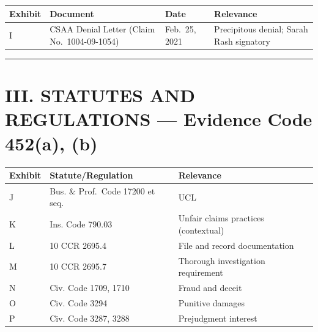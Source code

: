 {\def\LTcaptype{table} %
\begin{longtable}[]{@{}
  >{\raggedright\arraybackslash}p{}
  >{\raggedright\arraybackslash}p{}
  >{\raggedright\arraybackslash}p{}
  >{\raggedright\arraybackslash}p{}@{}}
\toprule\noalign{}
\begin{minipage}[b]{\linewidth}\raggedright
Exhibit
\end{minipage} & \begin{minipage}[b]{\linewidth}\raggedright
Document
\end{minipage} & \begin{minipage}[b]{\linewidth}\raggedright
Date
\end{minipage} & \begin{minipage}[b]{\linewidth}\raggedright
Relevance
\end{minipage} \\
\midrule\noalign{}
\endhead
\bottomrule\noalign{}
\endlastfoot
I & CSAA Denial Letter (Claim No.~1004-09-1054) & Feb.~25, 2021 & Precipitous denial; Sarah Rash signatory \\
\end{longtable}
}

\begin{center}\rule{0.5\linewidth}{0.5pt}\end{center}

\section{III. STATUTES AND REGULATIONS --- Evidence Code \textsection{}\textsection{} 452(a), (b)}\label{iii.-statutes-and-regulations-evidence-code-452a-b}

{\def\LTcaptype{table} %
\begin{longtable}[]{@{}lll@{}}
\toprule\noalign{}
Exhibit & Statute/Regulation & Relevance \\
\midrule\noalign{}
\endhead
\bottomrule\noalign{}
\endlastfoot
J & Bus. \& Prof.~Code \textsection{} 17200 et seq. & UCL \\
K & Ins. Code \textsection{} 790.03 & Unfair claims practices (contextual) \\
L & 10 CCR \textsection{} 2695.4 & File and record documentation \\
M & 10 CCR \textsection{} 2695.7 & Thorough investigation requirement \\
N & Civ. Code \textsection{}\textsection{} 1709, 1710 & Fraud and deceit \\
O & Civ. Code \textsection{} 3294 & Punitive damages \\
P & Civ. Code \textsection{}\textsection{} 3287, 3288 & Prejudgment interest \\
\end{longtable}
}

